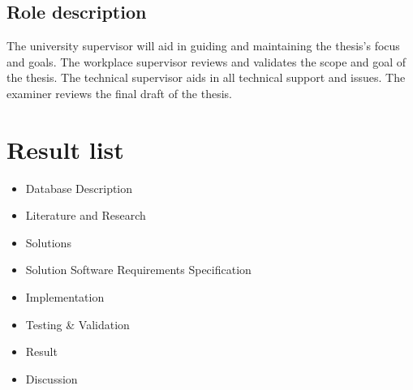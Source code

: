 \documentclass[12pt,a4paper]{article}
\begin{document}
\subsection*{Role description}
The university supervisor will aid in guiding and maintaining the thesis's focus and goals. The workplace supervisor reviews and validates the scope and goal of the thesis. The technical supervisor aids in all technical support and issues. The examiner reviews the final draft of the thesis. 

\section*{Result list}
\begin{itemize}
\item Database Description
\item Literature and Research
\item Solutions
\item Solution Software Requirements Specification
\item Implementation
\item Testing \& Validation
\item Result
\item Discussion
\end{itemize}
\end{document}
